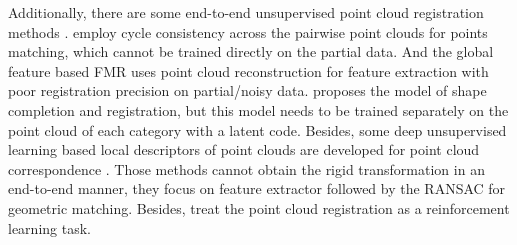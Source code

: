 \documentclass[letterpaper]{article} %
\begin{document}
	
	Additionally, there are some end-to-end unsupervised point cloud registration methods \cite{kadam2020unsupervised,feng2021recurrent,li2019pc,el2021unsupervisedr}. 
	\cite{yang2020mapping,groueix2019unsupervised} employ cycle consistency across the pairwise point clouds for points matching, which cannot be trained directly on the partial data. And the global feature based FMR \cite{huang2020feature} uses point cloud reconstruction for feature extraction with poor registration precision on partial/noisy data. \cite{li2020unsupervised} proposes the model of shape completion and registration, but this model needs to be trained separately on the point cloud of each category with a latent code. %
	Besides, some deep unsupervised learning based local descriptors of point clouds are developed for point cloud correspondence \cite{li2021updesc,li2019usip}. Those methods cannot obtain the rigid transformation in an end-to-end manner, they focus on feature extractor followed by the RANSAC for geometric matching. 
	Besides, \cite{bauer2021reagent,jiang2021CEMNet,jiangplanning} treat the point cloud registration as a reinforcement learning task.
	
\end{document}
